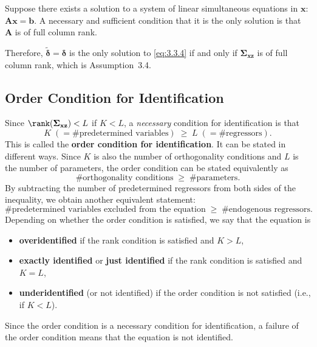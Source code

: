 Suppose there exists a solution to a system of linear simultaneous equations
in $\mathbf{x}$: $\mathbf{A}\mathbf{x} = \mathbf{b}$.  A necessary and sufficient condition that it is the only
solution is that $\mathbf{A}$ is of full column rank.

Therefore, $\tilde{\boldsymbol{\delta}} = \boldsymbol{\delta}$ is the only solution to \eqref{eq:3.3.4} if
and only if $\boldsymbol{\Sigma}_{\mathbf{xz}}$ is of full column rank, which is Assumption~3.4.

\subsection*{Order Condition for Identification}

Since $\rank(\boldsymbol{\Sigma}_{\mathbf{xz}}) < L$ if $K < L$, a \emph{necessary}
condition for identification is that
\begin{equation}
  K \; (= \text{\#predetermined variables})
  \;\geq\; L \; (= \text{\#regressors}).
  \label{eq:3.3.5a}
\end{equation}
This is called the \textbf{order condition for identification}.  It can be stated in different
ways.  Since $K$ is also the number of orthogonality conditions and $L$ is the number
of parameters, the order condition can be stated equivalently as
\begin{equation}
  \text{\#orthogonality conditions} \;\geq\; \text{\#parameters}.
  \label{eq:3.3.5b}
\end{equation}
By subtracting the number of predetermined regressors from both sides of the
inequality, we obtain another equivalent statement:
\begin{equation}
  \text{\#predetermined variables excluded from the equation}
  \;\geq\; \text{\#endogenous regressors}.
  \label{eq:3.3.5c}
\end{equation}
Depending on whether the order condition is satisfied, we say that the equation is
\begin{itemize}
\item \textbf{overidentified} if the rank condition is satisfied and $K > L$,
\item \textbf{exactly identified} or \textbf{just identified} if the rank condition is satisfied
  and $K = L$,
\item \textbf{underidentified} (or not identified) if the order condition is not satisfied
  (i.e., if $K < L$).
\end{itemize}
Since the order condition is a necessary condition for identification, a failure of the
order condition means that the equation is not identified.

